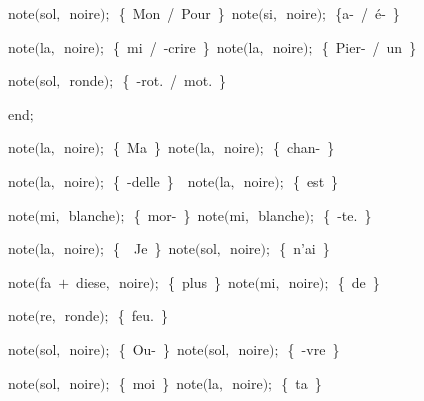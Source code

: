 {\vspace{\neglskip}\mbox{\blc  \blk\blk\blk\blk\idt  note$($sol$,$\ noire$)$$;$\ \cmt  \{\ Mon\ /\ Pour\ \}\idt \ note$($si$,$\ noire$)$$;$\ \cmt  \{a-\ /\ é-\ \}\idt }\par 
\vspace{\neglskip}\mbox{\blc  \blk\blk\blk\blk\idt  note$($la$,$\ noire$)$$;$\ \cmt  \{\ mi\ /\ -crire\ \}\idt \ note$($la$,$\ noire$)$$;$\ \cmt  \{\ Pier-\ /\ un\ \}\idt }\par 
\vspace{\neglskip}\mbox{\blc  \blk\blk\blk\blk\idt  note$($sol$,$\ ronde$)$$;$\ \cmt  \{\ -rot.\ /\ mot.\ \}\idt }\par 
\vspace{\neglskip}\mbox{\blc  \blk\blk\blk\idt  \mcl end\idt $;$}\par 
\vspace{\neglskip}\mbox{\blc  \blk\blk\idt  note$($la$,$\ noire$)$$;$\ \cmt  \{\ Ma\ \}\idt \ note$($la$,$\ noire$)$$;$\ \cmt  \{\ chan-\ \}\idt }\par 
\vspace{\neglskip}\mbox{\blc  \blk\blk\idt  note$($la$,$\ noire$)$$;$\ \cmt  \{\ -delle\ \}\idt \ \ note$($la$,$\ noire$)$$;$\ \cmt  \{\ est\ \}\idt }\par 
\vspace{\neglskip}\mbox{\blc  \blk\blk\idt  note$($mi$,$\ blanche$)$$;$\ \cmt  \{\ mor-\ \}\idt \ note$($mi$,$\ blanche$)$$;$\ \cmt  \{\ -te.\ \}\idt }\par 
\vspace{\neglskip}\mbox{\blc  \blk\blk\idt  note$($la$,$\ noire$)$$;$\ \cmt  \{\ \ Je\ \}\idt \ note$($sol$,$\ noire$)$$;$\ \cmt  \{\ n{'}ai\ \}\idt }\par 
\vspace{\neglskip}\mbox{\blc  \blk\blk\idt  note$($fa\ $+$\ diese$,$\ noire$)$$;$\ \cmt  \{\ plus\ \}\idt \ note$($mi$,$\ noire$)$$;$\ \cmt  \{\ de\ \}\idt }\par 
\vspace{\neglskip}\mbox{\blc  \blk\blk\idt  note$($re$,$\ ronde$)$$;$\ \cmt  \{\ feu.\ \}\idt }\par 
\vspace{\neglskip}\mbox{\blc  \blk\blk\idt  note$($sol$,$\ noire$)$$;$\ \cmt  \{\ Ou-\ \}\idt \ note$($sol$,$\ noire$)$$;$\ \cmt  \{\ -vre\ \}\idt }\par 
\vspace{\neglskip}\mbox{\blc  \blk\blk\idt  note$($sol$,$\ noire$)$$;$\ \cmt  \{\ moi\ \}\idt \ note$($la$,$\ noire$)$$;$\ \cmt  \{\ ta\ \}\idt }\par 
}
